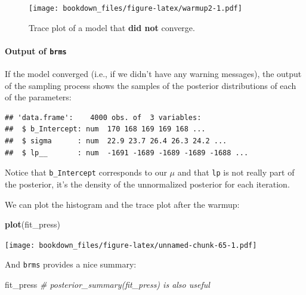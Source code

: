 \documentclass[12pt,]{krantz}
\newenvironment{Shaded}{\begin{snugshade}}{\end{snugshade}}
\newcommand{\KeywordTok}[1]{\textcolor[rgb]{0.13,0.29,0.53}{\textbf{#1}}}
\newcommand{\StringTok}[1]{\textcolor[rgb]{0.31,0.60,0.02}{#1}}
\newcommand{\CommentTok}[1]{\textcolor[rgb]{0.56,0.35,0.01}{\textit{#1}}}
\newcommand{\OperatorTok}[1]{\textcolor[rgb]{0.81,0.36,0.00}{\textbf{#1}}}
\newcommand{\NormalTok}[1]{#1}
\let\oldparagraph\paragraph
\renewcommand{\paragraph}[1]{\oldparagraph{#1}\mbox{}}
\theoremstyle{definition}
\theoremstyle{definition}
\theoremstyle{definition}
\theoremstyle{remark}
\begin{document}
\begin{figure}
\centering
\texttt{[image: bookdown\_files/figure-latex/warmup2-1.pdf]}
\caption{\label{fig:warmup2}Trace plot of a model that \textbf{did not} converge.}
\end{figure}

\paragraph{\texorpdfstring{Output of
\texttt{brms}}{Output of brms}}\label{output-of-brms}

If the model converged (i.e., if we didn't have any warning messages),
the output of the sampling process shows the samples of the posterior
distributions of each of the parameters:

\begin{Shaded}
\end{Shaded}

\begin{verbatim}
## 'data.frame':    4000 obs. of  3 variables:
##  $ b_Intercept: num  170 168 169 169 168 ...
##  $ sigma      : num  22.9 23.7 26.4 26.3 24.2 ...
##  $ lp__       : num  -1691 -1689 -1689 -1689 -1688 ...
\end{verbatim}

Notice that \texttt{b\_Intercept} corresponds to our \(\mu\) and that
\texttt{lp} is not really part of the posterior, it's the density of the
unnormalized posterior for each iteration.

We can plot the histogram and the trace plot after the warmup:

\begin{Shaded}
\begin{Highlighting}[]
\KeywordTok{plot}\NormalTok{(fit_press)}
\end{Highlighting}
\end{Shaded}

\texttt{[image: bookdown\_files/figure-latex/unnamed-chunk-65-1.pdf]}

And \texttt{brms} provides a nice summary:

\begin{Shaded}
\begin{Highlighting}[]
\NormalTok{fit_press}
\CommentTok{# posterior_summary(fit_press) is also useful}
\end{Highlighting}
\end{Shaded}
\end{document}
